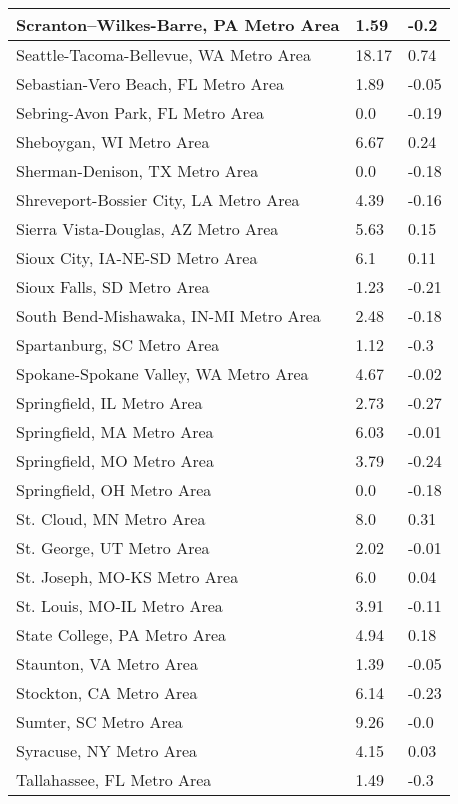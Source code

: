 \documentclass[12pt,oneside, letterpaper]{book}
\begin{document}
\begin{longtable}{| p{} | p{} | p{} |}
    Scranton--Wilkes-Barre, PA Metro Area & 1.59 & -0.2 \\ \hline
    Seattle-Tacoma-Bellevue, WA Metro Area & 18.17 & 0.74 \\ \hline
    Sebastian-Vero Beach, FL Metro Area & 1.89 & -0.05 \\ \hline
    Sebring-Avon Park, FL Metro Area & 0.0 & -0.19 \\ \hline
    Sheboygan, WI Metro Area & 6.67 & 0.24 \\ \hline
    Sherman-Denison, TX Metro Area & 0.0 & -0.18 \\ \hline
    Shreveport-Bossier City, LA Metro Area & 4.39 & -0.16 \\ \hline
    Sierra Vista-Douglas, AZ Metro Area & 5.63 & 0.15 \\ \hline
    Sioux City, IA-NE-SD Metro Area & 6.1 & 0.11 \\ \hline
    Sioux Falls, SD Metro Area & 1.23 & -0.21 \\ \hline
    South Bend-Mishawaka, IN-MI Metro Area & 2.48 & -0.18 \\ \hline
    Spartanburg, SC Metro Area & 1.12 & -0.3 \\ \hline
    Spokane-Spokane Valley, WA Metro Area & 4.67 & -0.02 \\ \hline
    Springfield, IL Metro Area & 2.73 & -0.27 \\ \hline
    Springfield, MA Metro Area & 6.03 & -0.01 \\ \hline
    Springfield, MO Metro Area & 3.79 & -0.24 \\ \hline
    Springfield, OH Metro Area & 0.0 & -0.18 \\ \hline
    St. Cloud, MN Metro Area & 8.0 & 0.31 \\ \hline
    St. George, UT Metro Area & 2.02 & -0.01 \\ \hline
    St. Joseph, MO-KS Metro Area & 6.0 & 0.04 \\ \hline
    St. Louis, MO-IL Metro Area & 3.91 & -0.11 \\ \hline
    State College, PA Metro Area & 4.94 & 0.18 \\ \hline
    Staunton, VA Metro Area & 1.39 & -0.05 \\ \hline
    Stockton, CA Metro Area & 6.14 & -0.23 \\ \hline
    Sumter, SC Metro Area & 9.26 & -0.0 \\ \hline
    Syracuse, NY Metro Area & 4.15 & 0.03 \\ \hline
    Tallahassee, FL Metro Area & 1.49 & -0.3 \\ \hline

\end{longtable}
\end{document}
